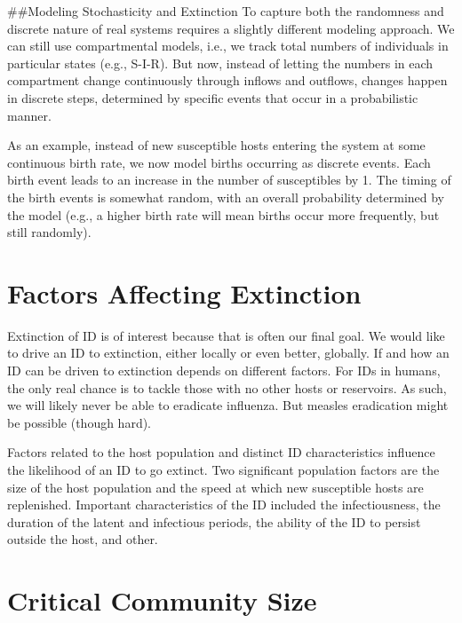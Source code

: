 \documentclass[]{book}
\theoremstyle{definition}
\theoremstyle{definition}
\theoremstyle{definition}
\theoremstyle{remark}
\begin{document}
\#\#Modeling Stochasticity and Extinction To capture both the randomness
and discrete nature of real systems requires a slightly different
modeling approach. We can still use compartmental models, i.e., we track
total numbers of individuals in particular states (e.g., S-I-R). But
now, instead of letting the numbers in each compartment change
continuously through inflows and outflows, changes happen in discrete
steps, determined by specific events that occur in a probabilistic
manner.

As an example, instead of new susceptible hosts entering the system at
some continuous birth rate, we now model births occurring as discrete
events. Each birth event leads to an increase in the number of
susceptibles by 1. The timing of the birth events is somewhat random,
with an overall probability determined by the model (e.g., a higher
birth rate will mean births occur more frequently, but still randomly).

\hypertarget{factors-affecting-extinction}{%
\section{Factors Affecting
Extinction}\label{factors-affecting-extinction}}

Extinction of ID is of interest because that is often our final goal. We
would like to drive an ID to extinction, either locally or even better,
globally. If and how an ID can be driven to extinction depends on
different factors. For IDs in humans, the only real chance is to tackle
those with no other hosts or reservoirs. As such, we will likely never
be able to eradicate influenza. But measles eradication might be
possible (though hard).

Factors related to the host population and distinct ID characteristics
influence the likelihood of an ID to go extinct. Two significant
population factors are the size of the host population and the speed at
which new susceptible hosts are replenished. Important characteristics
of the ID included the infectiousness, the duration of the latent and
infectious periods, the ability of the ID to persist outside the host,
and other.

\hypertarget{critical-community-size}{%
\section{Critical Community Size}\label{critical-community-size}}
\end{document}
